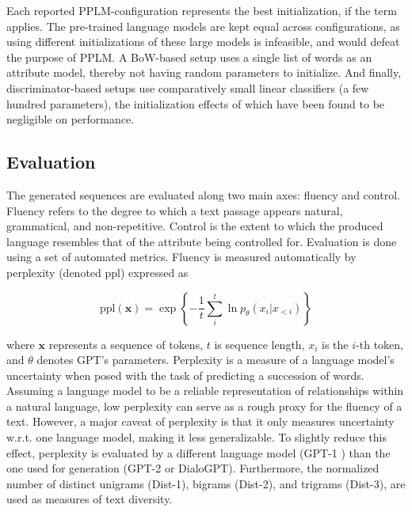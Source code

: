 Each reported PPLM-configuration represents the best initialization, if the term applies. The pre-trained language models are kept equal across configurations, as using different initializations of these large models is infeasible, and would defeat the purpose of PPLM. A BoW-based setup uses a single list of words as an attribute model, thereby not having random parameters to initialize. And finally, discriminator-based setups use comparatively small linear classifiers (a few hundred parameters), the initialization effects of which have been found to be negligible on performance.

\subsection{Evaluation}\label{subsec:exp_setup_eval}

The generated sequences are evaluated along two main axes: fluency and control. Fluency refers to the degree to which a text passage appears natural, grammatical, and non-repetitive. Control is the extent to which the produced language resembles that of the attribute being controlled for. Evaluation is done using a set of automated metrics. Fluency is measured automatically by perplexity (denoted ppl) 
expressed as

\begin{equation}
    \text{ppl}(\textbf{x}) = \exp \left\{ - \frac{1}{t} \sum_{i}^t \ln p_{\theta}(x_i | x_{<i})\right\}    
\end{equation}

where $\textbf{x}$ represents a sequence of tokens, $t$ is sequence length, $x_i$ is the $i$-th token, and $\theta$ denotes GPT's parameters. Perplexity is a measure of a language model's uncertainty when posed with the task of predicting a succession of words. Assuming a language model to be a reliable representation of relationships within a natural language, low perplexity can serve as a rough proxy for the fluency of a text. However, a major caveat of perplexity is that it only measures uncertainty w.r.t. one language model, making it less generalizable. To slightly reduce this effect, perplexity is evaluated by a different language model (GPT-1 \citep{radford2018improving}) than the one used for generation (GPT-2 or DialoGPT).
Furthermore, the normalized number of distinct unigrams (Dist-1), bigrams (Dist-2), and trigrams (Dist-3), are used as measures of text diversity. 

